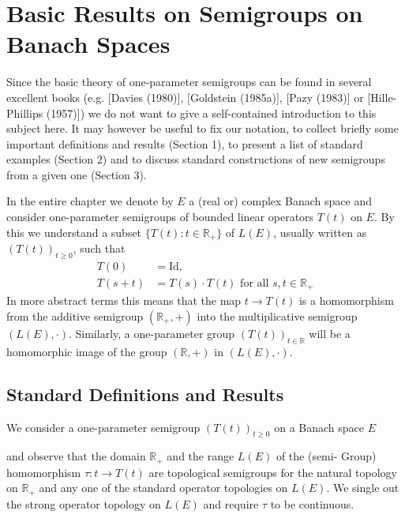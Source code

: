 

\chapter{Basic Results on Semigroups on Banach Spaces}\label{chap:a1}

Since the basic theory of one-parameter semigroups can be found in several excellent books (e.g. [Davies (1980)], [Goldstein (1985a)], [Pazy (1983)] or [Hille-Phillips (1957)]) we do not want to give a self-contained introduction to this subject here.
It may however be useful to fix our notation, to collect briefly some important definitions and results (Section 1), to present a list of standard examples (Section 2) and to discuss standard constructions of new semigroups from a given one (Section 3).

In the entire chapter we denote by $E$ a (real or) complex Banach space and consider one-parameter semigroups of bounded linear operators $T(t)$ on $E$.
By this we understand a subset $\{T(t) \colon  t \in \mathbb{R}_{+}\}$ of $L(E)$, usually written as $(T(t))_{t\geq0}$, such that
\begin{align*}
	T(0) &= \text{Id}, \\
	T(s+t) &= T(s) \cdot T(t) \text{ for all } s, t \in \mathbb{R}_{+}
\end{align*}
In more abstract terms this means that the map $t \to T(t)$ is a homomorphism from the additive semigroup $(\mathbb{R}_{+},+)$ into the multiplicative semigroup $(L(E),\cdot)$.
Similarly, a one-parameter group $(T(t))_{t\in\mathbb{R}}$ will be a homomorphic image of the group $(\mathbb{R},+)$ in $(L(E),\cdot)$.
\section{Standard Definitions and Results}\label{sec:a1-1}
We consider a one-parameter semigroup $(T(t))_{t \geq 0}$ on a Banach space $E$ 

\newpage
and observe that the domain $\mathbb{R}_{+}$ and the range $L(E)$ of the (semi-
Group) homomorphism $\tau \colon t \to T(t)$ are topological semigroups for the natural topology on $\mathbb{R}_{+}$ and any one of the standard operator topologies on $L(E)$.
We single out the strong operator topology on $L(E)$ and require $\tau$ to be continuous.

